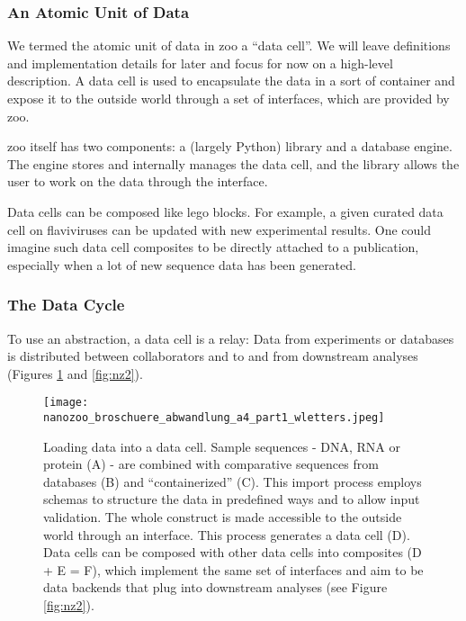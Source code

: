\subsubsection{An Atomic Unit of Data}

We termed the atomic unit of data in zoo a ``data cell''. We will leave definitions and implementation details for later and focus for now on a high-level description. A data cell is used to encapsulate the data in a sort of container and expose it to the outside world through a set of interfaces, which are provided by zoo.

zoo itself has two components: a (largely Python) library and a database engine. The engine stores and internally manages the data cell, and the library allows the user to work on the data through the interface.

Data cells can be composed like lego blocks. For example, a given curated data cell on flaviviruses can be updated with new experimental results. One could imagine such data cell composites to be directly attached to a publication, especially when a lot of new sequence data has been generated.


\subsubsection{The Data Cycle}

To use an abstraction, a data cell is a relay: Data from experiments or databases is distributed between collaborators and to and from downstream analyses (Figures \ref{fig:nz1} and \ref{fig:nz2}).


\begin{figure}[H]
    \begin{center}\texttt{[image: nanozoo\_broschuere\_abwandlung\_a4\_part1\_wletters.jpeg]}\end{center}
    \caption[Infographic: Loading data into a data cell.]{Loading data into a data cell. Sample sequences - DNA, RNA or protein (A) - are combined with comparative sequences from databases (B) and ``containerized'' (C). This import process employs schemas to structure the data in predefined ways and to allow input validation. The whole construct is made accessible to the outside world through an interface. This process generates a data cell (D). Data cells can be composed with other data cells into composites (D + E = F), which implement the same set of interfaces and aim to be data backends that plug into downstream analyses (see Figure \ref{fig:nz2}).}
    \label{fig:nz1}
\end{figure}


